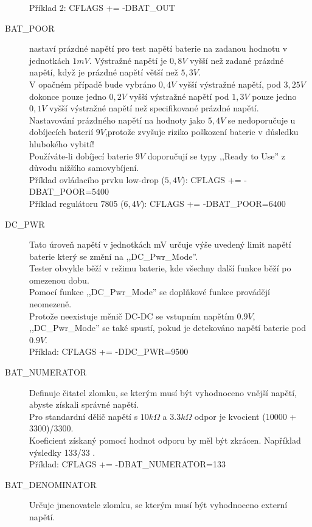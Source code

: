 \begin{description}
Příklad 2: CFLAGS += -DBAT\_OUT
\vspace{-0,3cm}
  \item[BAT\_POOR]  nastaví prázdné napětí pro test napětí baterie na zadanou hodnotu v jednotkách \(1mV\).
Výstražné napětí je \(0,8V\) vyšší než zadané prázdné napětí, když je prázdné napětí větší než \(5,3V\).\\
V opačném případě bude vybráno \(0,4V\) vyšší výstražné napětí, pod \(3,25V\) dokonce pouze jedno \(0,2V\) vyšší výstražné napětí pod \(1,3V\) pouze jedno \(0,1V\) vyšší výstražné napětí než specifikované prázdné napětí.\\
Nastavování prázdného napětí na hodnoty jako \(5,4V\) se nedoporučuje u dobíjecích baterií \(9V\),protože zvyšuje riziko poškození baterie v důsledku hlubokého vybití!\\
Používáte-li dobíjecí baterie \(9V\) doporučují se typy ,,Ready to Use'' z důvodu nižšího samovybíjení.\\
Příklad ovládacího prvku low-drop (\(5,4V\)): CFLAGS += -DBAT\_POOR=5400 \\
Příklad regulátoru 7805 (\(6,4V\)): CFLAGS += -DBAT\_POOR=6400
\vspace{-0,3cm}
  \item[DC\_PWR] Tato úroveň napětí v jednotkách mV určuje výše uvedený limit napětí baterie
který se změní na ,,DC\_Pwr\_Mode''.\\Tester obvykle běží v režimu baterie,
kde všechny další funkce běží po omezenou dobu.\\
Pomocí funkce ,,DC\_Pwr\_Mode'' se doplňkové funkce provádějí neomezeně.\\
Protože neexistuje měnič DC-DC se vstupním napětím \(0.9V\),
,,DC\_Pwr\_Mode'' se také spustí, pokud je detekováno napětí baterie pod  \(0.9V\).\\
Příklad: CFLAGS += -DDC\_PWR=9500
\vspace{-0,3cm}
 \item[BAT\_NUMERATOR] Definuje čitatel zlomku, se kterým musí být vyhodnoceno vnější napětí, abyste získali správné napětí.\\
Pro standardní dělič napětí s \(10 k\Omega\) a \(3.3 k\Omega\) odpor je kvocient (10000 + 3300)/3300.\\ 
Koeficient získaný pomocí hodnot odporu by měl být zkrácen. Například výsledky 133/33 .\\
Příklad: CFLAGS += -DBAT\_NUMERATOR=133
\vspace{-0,3cm}
 \item[BAT\_DENOMINATOR] Určuje jmenovatele zlomku, se kterým musí být vyhodnoceno externí napětí.\\

\end{description}
